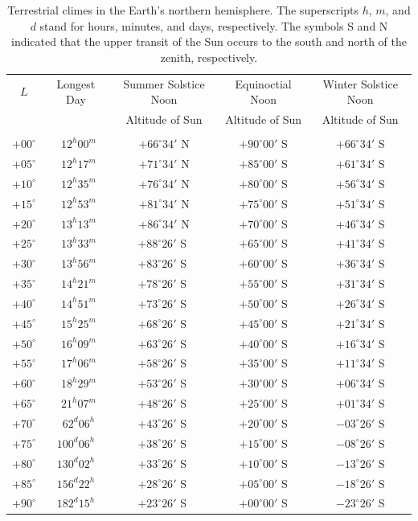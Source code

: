 \clearpage
\begin{table}[!h]
\vspace{0.25cm}
\centering
{\small
\begin{tabular}{ccccc}\hline
$L$ & Longest Day & Summer Solstice  Noon& Equinoctial Noon  & Winter Solstice Noon\\
&&Altitude of Sun & Altitude of Sun & Altitude of Sun\\ \hline
&&&&\\[-2ex]
$+00^\circ$ &~$12^h00^m$ & $+66^\circ 34'$ N& $+90^\circ 00 '$ S & $+66^\circ 34'$ S\\
$+05^\circ$ &~$12^h17^m$&$+71^\circ 34'$ N&$+85^\circ 00'$ S&$+61^\circ 34'$ S\\
$+10^\circ$ &~$12^h35^m$&$+76^\circ 34'$ N&$+80^\circ 00'$ S&$+56^\circ 34'$ S\\
$+15^\circ$ &~$12^h53^m$&$+81^\circ 34'$ N&$+75^\circ 00'$ S&$+51^\circ 34'$ S\\
$+20^\circ$ &~$13^h13^m$&$+86^\circ 34'$ N&$+70^\circ 00'$ S&$+46^\circ 34'$ S\\
$+25^\circ$ &~$13^h33^m$&$+88^\circ 26'$ S\,\,&$+65^\circ 00'$ S&$+41^\circ 34'$ S\\
$+30^\circ$ &~$13^h56^m$&$+83^\circ 26'$ S\,\,&$+60^\circ 00'$ S&$+36^\circ 34'$ S\\
$+35^\circ$ &~$14^h21^m$&$+78^\circ 26'$ S\,\,&$+55^\circ 00'$ S&$+31^\circ 34'$ S\\
$+40^\circ$ &~$14^h51^m$&$+73^\circ 26'$ S\,\,&$+50^\circ 00'$ S&$+26^\circ 34'$ S\\
$+45^\circ$ &~$15^h25^m$&$+68^\circ 26'$ S\,\,&$+45^\circ 00'$ S&$+21^\circ 34'$ S\\
$+50^\circ$ &~$16^h09^m$&$+63^\circ 26'$ S\,\,&$+40^\circ 00'$ S&$+16^\circ 34'$ S\\
$+55^\circ$ &~$17^h06^m$&$+58^\circ 26'$ S\,\,&$+35^\circ 00'$ S&$+11^\circ 34'$ S\\
$+60^\circ$ &~$18^h29^m$&$+53^\circ 26'$ S\,\,&$+30^\circ 00'$ S&$+06^\circ 34'$ S\\
$+65^\circ$ &~$21^h07^m$&$+48^\circ 26'$ S\,\,&$+25^\circ 00'$ S&$+01^\circ 34'$ S\\
$+70^\circ$ &~$62^d 06^h$&$+43^\circ 26'$ S\,\,&$+20^\circ 00'$ S&$-03^\circ 26'$ S\\
$+75^\circ$ &$100^d06^h$&$+38^\circ 26'$ S\,\,&$+15^\circ 00'$ S&$-08^\circ 26'$ S\\
$+80^\circ$ &$130^d02^h$&$+33^\circ 26'$ S\,\,&$+10^\circ 00'$ S&$-13^\circ 26'$ S\\
$+85^\circ$ &$156^d22^h$&$+28^\circ 26'$ S\,\,&$+05^\circ 00'$ S&$-18^\circ 26'$ S\\
$+90^\circ$ &$182^d15^h$&$+23^\circ 26'$ S\,\,&$+00^\circ 00'$ S&$-23^\circ 26'$ S\\
\end{tabular}}
\caption{Terrestrial climes in the Earth's northern hemisphere. The superscripts $h$, $m$, and $d$ stand for
hours, minutes, and days, respectively. The symbols S and N indicated that the upper transit of the Sun occurs to the south and north of the zenith, respectively.}\label{t3}
\end{table}

